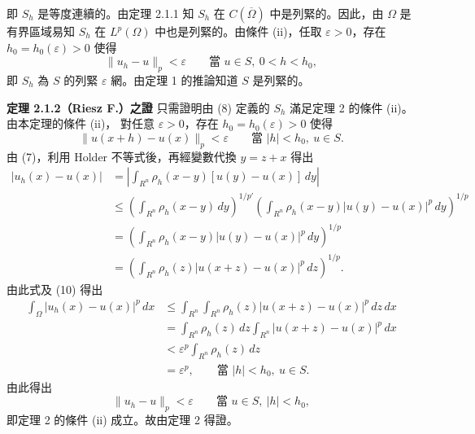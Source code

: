 \documentclass[11pt,a4paper,twoside]{article}
\begin{document}
\newpage

即 $S_h$ 是等度連續的。由定理 2.1.1 知 $S_h$ 在
$C(\overline{\Omega})$ 中是列緊的。因此，由 $\Omega$ 是有界區域易知
$S_h$ 在 $L^p(\Omega)$ 中也是列緊的。由條件 (ii)，任取
$\varepsilon>0$，存在 $h_0=h_0(\varepsilon)>0$ 使得
\[
    \|u_h-u\|_p<\varepsilon
    \qquad
    \text{當 }u\in S,\ 0<h<h_0,
\]
即 $S_h$ 為 $S$ 的列緊 $\varepsilon$ 網。由定理 1 的推論知道 $S$ 是列緊的。

\noindent\textbf{定理 2.1.2（Riesz F.）之證}\quad
只需證明由 (8) 定義的 $S_h$ 滿足定理 2 的條件 (ii)。由本定理的條件 (ii)，
對任意 $\varepsilon>0$，存在 $h_0=h_0(\varepsilon)>0$ 使得
\[
    \|u(x+h)-u(x)\|_p<\varepsilon
    \qquad
    \text{當 }|h|<h_0,\ u\in S.
    \tag{10}
\]
由 (7)，利用 Holder 不等式後，再經變數代換 $y=z+x$ 得出
\[
    \begin{aligned}
        |u_h(x)-u(x)|
         & =
        \left|
        \int_{R^n}\rho_h(x-y)[u(y)-u(x)]\,dy
        \right|       \\
         & \le
        \left(\int_{R^n}\rho_h(x-y)\,dy\right)^{1/p'}
        \left(
        \int_{R^n}
        \rho_h(x-y)|u(y)-u(x)|^p\,dy
        \right)^{1/p} \\
         & =
        \left(
        \int_{R^n}
        \rho_h(x-y)|u(y)-u(x)|^p\,dy
        \right)^{1/p} \\
         & =
        \left(
        \int_{R^n}
        \rho_h(z)|u(x+z)-u(x)|^p\,dz
        \right)^{1/p}.
    \end{aligned}
\]
由此式及 (10) 得出
\[
    \begin{aligned}
        \int_\Omega|u_h(x)-u(x)|^p\,dx
         & \le
        \int_{R^n}\int_{R^n}
        \rho_h(z)|u(x+z)-u(x)|^p\,dz\,dx     \\
         & =
        \int_{R^n}\rho_h(z)\,dz
        \int_{R^n}|u(x+z)-u(x)|^p\,dx        \\
         & <
        \varepsilon^p\int_{R^n}\rho_h(z)\,dz \\
         & =
        \varepsilon^p,
        \qquad
        \text{當 }|h|<h_0,\ u\in S.
    \end{aligned}
\]
由此得出
\[
    \|u_h-u\|_p<\varepsilon
    \qquad
    \text{當 }u\in S,\ |h|<h_0,
\]
即定理 2 的條件 (ii) 成立。故由定理 2 得證。
\end{document}
